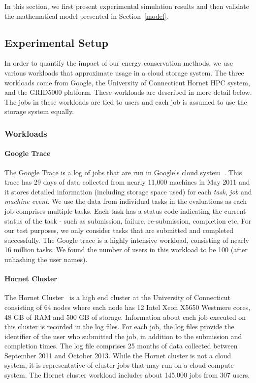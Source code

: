 In this section, we first present experimental simulation results and
then validate the mathematical model presented in Section~\ref{model}.

\subsection{Experimental Setup}
In order to quantify the impact of our energy conservation methods,
we use various workloads that approximate usage in a cloud storage
system. The three workloads come from Google, the University of
Connecticut Hornet HPC system, and the GRID5000 platform. These workloads
are described in more detail below. The jobs in these workloads
are tied to users and each job is assumed to use the storage system equally.

\subsubsection{Workloads}
\paragraph{Google Trace}
The Google Trace is a log of jobs that are run in Google's cloud
system~\cite{clusterdata:Wilkes2011}. This trace has 29 days of data
collected from nearly 11,000 machines in May 2011 and it stores
detailed information (including storage space used) for each \textit{task},
\textit{job} and \textit{machine event}. We use the data from individual tasks in the
evaluations as each job comprises multiple tasks. Each task has a status
code indicating the current status of the task - such as submission, failure,
re-submission, completion etc. For our test purposes, we only consider tasks
that are submitted and completed successfully. The Google trace is a highly 
intensive workload, consisting of nearly 16 million tasks. We found the number
of users in this workload to be 100 (after unhashing the user names).

\paragraph{Hornet Cluster}
The Hornet Cluster~\cite{hornet} is a high end cluster at the University
of Connecticut consisting of 64 nodes where each node has 12 Intel Xeon X5650
Westmere cores, 48 GB of RAM and 500 GB of storage. Information about each
job executed on this cluster is recorded in the log files. For each job, the log files
provide the identifier of the user who submitted the job, in addition to the
submission and completion times. The log file comprises 25 months of data
collected between September 2011 and October 2013. While the Hornet cluster
is not a cloud system, it is representative of cluster jobs that may run on
a cloud compute system. The Hornet cluster workload includes about 145,000
jobs from 307 users.

